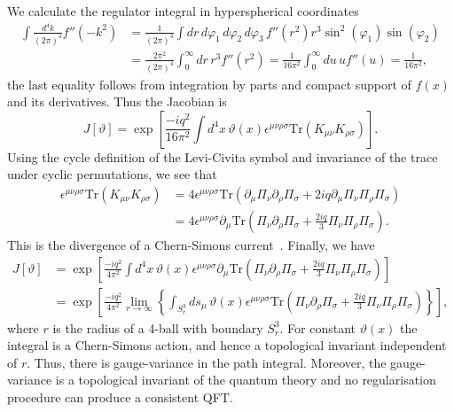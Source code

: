 \documentclass[11pt, a4paper]{article}
\begin{document}
We calculate the regulator integral in hyperspherical coordinates
\begin{equation}
\begin{split}
  \int{\frac{d^4k}{(2\pi)^4}f''(-k^2) }
  & = \frac{1}{(2\pi)^4}\int{dr\,d\varphi_1\,d\varphi_2\,d\varphi_3\,
   f''(r^2)r^3\sin^2(\varphi_1)\sin(\varphi_2)} \\
  & = \frac{2\pi^2}{(2\pi)^4}\int^{\infty}_0{dr\,r^3f''(r^2)}
  = \frac{1}{16\pi^2}\int_0^\infty{du\,uf''(u)} = \frac{1}{16\pi^2},
\end{split}
\end{equation}
the last equality follows from integration by parts and compact support of 
$f(x)$ and its derivatives. Thus the Jacobian is 
\begin{equation}
J[\vartheta] = \exp{\left[ \frac{-iq^2}{16\pi^2} \int{d^4x\,  \vartheta(x)} 
      \epsilon^{\mu\nu\rho\sigma}\mathrm{Tr}(K_{\mu\nu}K_{\rho\sigma}) \right]}.
\end{equation}
Using the cycle definition of the Levi-Civita symbol and invariance of the 
trace under cyclic permutations, we see that
\begin{equation}
  \begin{split}
    \epsilon^{\mu\nu\rho\sigma}\mathrm{Tr}(K_{\mu\nu}K_{\rho\sigma})
    & = 4 \epsilon^{\mu\nu\rho\sigma}\mathrm{Tr}( \partial_\mu\Pi_\nu\partial_\rho\Pi_\sigma
  +2iq\partial_\mu\Pi_\nu\Pi_\rho\Pi_\sigma) \\
    & = 4 \epsilon^{\mu\nu\rho\sigma}\partial_\mu\mathrm{Tr}\left( \Pi_\nu\partial_\rho\Pi_\sigma
   + \frac{2iq}{3} \Pi_\nu\Pi_\rho\Pi_\sigma\right).
  \end{split}
\end{equation}
This is the divergence of a Chern-Simons current~\cite{Witten1989,CSreview}.
Finally, we have
\begin{equation}
  \begin{split}
    J[\vartheta] & = \exp{\left[ \frac{-iq^2}{4\pi^2} \int{d^4x\, 
      \vartheta(x)\epsilon^{\mu\nu\rho\sigma}\partial_\mu\mathrm{Tr}
      \left( \Pi_\nu\partial_\rho\Pi_\sigma + 
      \frac{2iq}{3} \Pi_\nu\Pi_\rho\Pi_\sigma\right)} \right]} \\
  & = \exp{ \left[ \frac{-iq^2}{4\pi^2}
    \lim_{r \rightarrow \infty}{\left\{ \int_{S_r^3}{ds_\mu\,
    \vartheta(x)\epsilon^{\mu\nu\rho\sigma}\mathrm{Tr}
      \left( \Pi_\nu\partial_\rho\Pi_\sigma + 
      \frac{2iq}{3} \Pi_\nu\Pi_\rho\Pi_\sigma\right)} \right\}} \right]},
  \end{split}
\end{equation}
where $r$ is the radius of a 4-ball with boundary $S^3_r$.
For constant $\vartheta(x)$ the integral is a Chern-Simons action, and hence
a topological invariant independent of $r$.
Thus, there is gauge-variance in the path integral. Moreover, 
the gauge-variance is a topological invariant of the quantum theory and
no regularisation procedure can produce a consistent QFT\@. 
\end{document}
